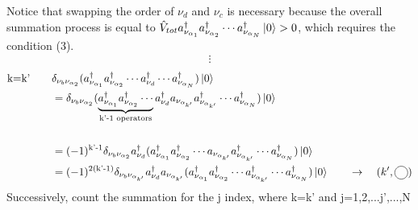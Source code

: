 \documentclass{article}
\newcommand\encircle[1]{%
    \tikz[baseline=(X.base)] 
      \node (X) [draw, shape=circle, inner sep=0] {\strut #1};}
\begin{document}
Notice that swapping the order of $\nu_d$ and $\nu_c$ is necessary because the overall summation process is equal to 
$\hat{V}_{tot} a^{\dagger}_{\nu_{\alpha_1}}a^{\dagger}_{\nu_{\alpha_2}}\cdots a^{\dagger}_{\nu_{\alpha_N}}\ket{0} > 0$, which requires the condition (3).
\begin{align*}
    \vdots
\end{align*}
\begin{align*}
    \text{k=k'} \qquad &\delta_{\nu_b \nu_{\alpha_2}} (a^{\dagger}_{\nu_{\alpha_1}} a^{\dagger}_{\nu_{\alpha_2}} \cdots a^{\dagger}_{\nu_d} \cdots a^{\dagger}_{\nu_{\alpha_N}})\ket{0}\\
    & =\delta_{\nu_b \nu_{\alpha_2}} (\underbrace{a^{\dagger}_{\nu_{\alpha_1}} a^{\dagger}_{\nu_{\alpha_2}} \cdots }_{\text{k'-1 operators}}a^{\dagger}_{\nu_d} a_{\nu_{\alpha_{k'}}} a^{\dagger}_{\nu_{\alpha_{k'}}}  \cdots a^{\dagger}_{\nu_{\alpha_N}})\ket{0}\\
    &\\
    & =(-1)^{\text{k'-1}}\delta_{\nu_b \nu_{\alpha_2}} a^{\dagger}_{\nu_d} (a^{\dagger}_{\nu_{\alpha_1}} a^{\dagger}_{\nu_{\alpha_2}} \cdots a_{\nu_{\alpha_{k'}}} a^{\dagger}_{\nu_{\alpha_{k'}}}  \cdots a^{\dagger}_{\nu_{\alpha_N}})\ket{0}\\
    & =(-1)^{2( \text{k'-1})}\delta_{\nu_b \nu_{\alpha_{k'}}} a^{\dagger}_{\nu_d} a_{\nu_{\alpha_{k'}}} (a^{\dagger}_{\nu_{\alpha_1}} a^{\dagger}_{\nu_{\alpha_2}} \cdots a^{\dagger}_{\nu_{\alpha_{k'}}}  \cdots a^{\dagger}_{\nu_{\alpha_N}})\ket{0} \qquad \rightarrow \quad (k',\encircle{})
\end{align*}
Successively, count the summation for the j index, where k=k' and j=1,2,...j',...,N
\end{document}
